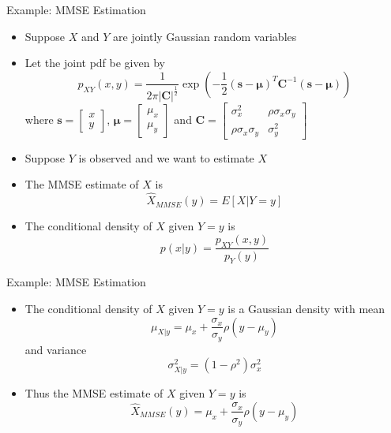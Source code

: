 \documentclass[t]{beamer}
\begin{document}
\begin{frame}{Example: MMSE Estimation}
  \footnotesize
  \begin{itemize}
    \item \pause Suppose $X$ and $Y$ are jointly Gaussian random variables
    \item \pause Let the joint pdf be given by
      \begin{equation*}
        p_{XY}(x,y) = \frac{1}{2\pi \lvert \mathbf{C} \rvert^{\frac{1}{2}}} \exp\left( -\frac{1}{2}(\mathbf{s} - \boldsymbol{\mu})^T\mathbf{C}^{-1}(\mathbf{s}-\boldsymbol{\mu})\right)
      \end{equation*}
    where $\mathbf{s} = \begin{bmatrix} x \\ y \end{bmatrix}$, $\boldsymbol{\mu} = \begin{bmatrix} \mu_x \\ \mu_y \end{bmatrix}$ and $\mathbf{C} = \begin{bmatrix} \sigma_x^2 & \rho \sigma_x \sigma_y \\ \rho \sigma_x \sigma_y & \sigma_y^2\end{bmatrix}$
    \item \pause Suppose $Y$ is observed and we want to estimate $X$
    \item \pause The MMSE estimate of $X$ is 
      \begin{equation*}
        \hat{X}_{MMSE}(y) = E\left[X \bigg| Y = y \right]
      \end{equation*}
    \item \pause The conditional density of $X$ given $Y = y$ is
      \begin{equation*}
        p(x|y) = \frac{p_{XY}(x,y)}{p_Y(y)}
      \end{equation*}
  \end{itemize}
  \normalsize
\end{frame}

\begin{frame}{Example: MMSE Estimation}
  \footnotesize
  \begin{itemize}
    \item The conditional density of $X$ given $Y=y$ is a Gaussian density with mean
      \begin{equation*}
        \mu_{X|y} = \mu_x + \frac{\sigma_x}{\sigma_y}\rho(y-\mu_y)
      \end{equation*}
      \pause and variance
      \begin{equation*}
        \sigma^2_{X|y} = (1-\rho^2)\sigma_x^2
      \end{equation*}
    \item \pause Thus the MMSE estimate of $X$ given $Y = y$ is
      \begin{equation*}
        \hat{X}_{MMSE}(y) = \mu_x + \frac{\sigma_x}{\sigma_y}\rho(y-\mu_y)
      \end{equation*}
  \end{itemize}
  \normalsize
\end{frame}
\end{document}
